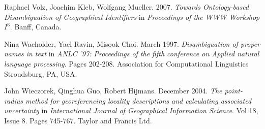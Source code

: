 \documentclass[11pt]{article}
\begin{document}
\begin{thebibliography}{9}
  Raphael Volz, Joachim Kleb, Wolfgang Mueller. 2007. \emph{Towards Ontology-based Disambiguation of Geographical Identifiers} in \emph{Proceedings of the WWW Workshop $I^{3}$}. Banff, Canada.
  
  Nina Wacholder, Yael Ravin, Misook Choi. March 1997. \emph{Disambiguation of proper names in text} in \emph{ANLC '97: Proceedings of the fifth conference on Applied natural language processing}. Pages 202-208. Association for Computational Linguistics Stroudsburg, PA, USA.
  
  John Wieczorek, Qinghua Guo, Robert Hijmans. December 2004. \emph{The point-radius method for georeferencing locality descriptions and calculating associated uncertainty} in \emph{International Journal of Geographical Information Science}. Vol 18, Issue 8. Pages 745-767. Taylor and Francis Ltd.

\end{thebibliography}
\end{document}
